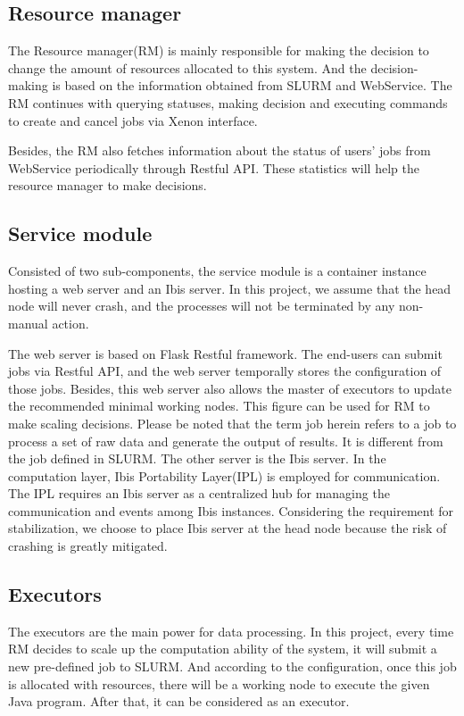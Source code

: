 \subsection{Resource manager}
The Resource manager(RM) is mainly responsible for making the decision to change the amount of resources allocated to this system. 
And the decision-making is based on the information obtained from SLURM and WebService. 
The RM continues with querying statuses, making decision and executing commands to create and cancel jobs via Xenon interface.

Besides, the RM also fetches information about the status of users’ jobs from WebService periodically through Restful API. 
These statistics will help the resource manager to make decisions.

\subsection{Service module}
Consisted of two sub-components, the service module is a container instance hosting a web server and an Ibis server. 
In this project, we assume that the head node will never crash, and the processes will not be terminated by any non-manual action.

The web server is based on Flask Restful framework. The end-users can submit jobs via Restful API, and the web server temporally stores the configuration	of those jobs. 
Besides, this web server also allows the master of executors to update the recommended minimal working nodes. 
This figure can be used for RM to make scaling decisions. 
Please be noted that the term job herein refers to a job to process a set of raw data and generate the output of results. It is different from the job defined in SLURM. The other server is the Ibis server. In the computation layer, Ibis Portability Layer(IPL)\cite{5492667} is employed for communication. 
The IPL requires an Ibis server as a centralized hub for managing the communication and events among Ibis instances. 
Considering the requirement for stabilization, we choose to place Ibis server at the head node because the risk of crashing is greatly mitigated.
 
\subsection{Executors}
The executors are the main power for data processing. 
In this project, every time RM decides to scale up the computation ability of the system, it will submit a new pre-defined job to SLURM. 
And according to the configuration,	once this job is allocated with resources, there will be a working node to execute the given Java program. 
After that, it can be considered as an executor.

